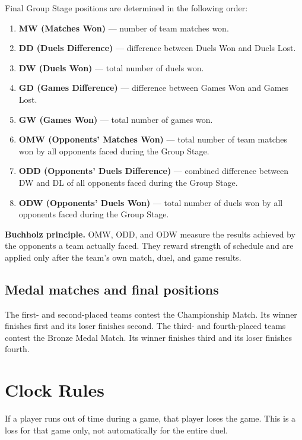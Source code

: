 \documentclass[10pt,a4paper]{article}
\newcommand{\term}[1]{\textbf{#1}}
\begin{document}
Final Group Stage positions are determined in the following order:

\begin{enumerate}
  \item \term{MW (Matches Won)} --- number of team matches won.
  \item \term{DD (Duels Difference)} --- difference between Duels Won and
        Duels Lost.
  \item \term{DW (Duels Won)} --- total number of duels won.
  \item \term{GD (Games Difference)} --- difference between Games Won and
        Games Lost.
  \item \term{GW (Games Won)} --- total number of games won.
  \item \term{OMW (Opponents' Matches Won)} --- total number of team matches
        won by all opponents faced during the Group Stage.
  \item \term{ODD (Opponents' Duels Difference)} --- combined difference
        between DW and DL of all opponents faced during the Group Stage.
  \item \term{ODW (Opponents' Duels Won)} --- total number of duels won by all
        opponents faced during the Group Stage.
\end{enumerate}

\begin{notebox}
\textbf{Buchholz principle.}
OMW, ODD, and ODW measure the results achieved by the opponents a team actually
faced. They reward strength of schedule and are applied only after the team's
own match, duel, and game results.
\end{notebox}

\subsection{Medal matches and final positions}

The first- and second-placed teams contest the Championship Match. Its winner
finishes first and its loser finishes second. The third- and fourth-placed teams
contest the Bronze Medal Match. Its winner finishes third and its loser finishes
fourth.

\section{Clock Rules}

If a player runs out of time during a game, that player loses the game. This is
a loss for that game only, not automatically for the entire duel.
\end{document}
